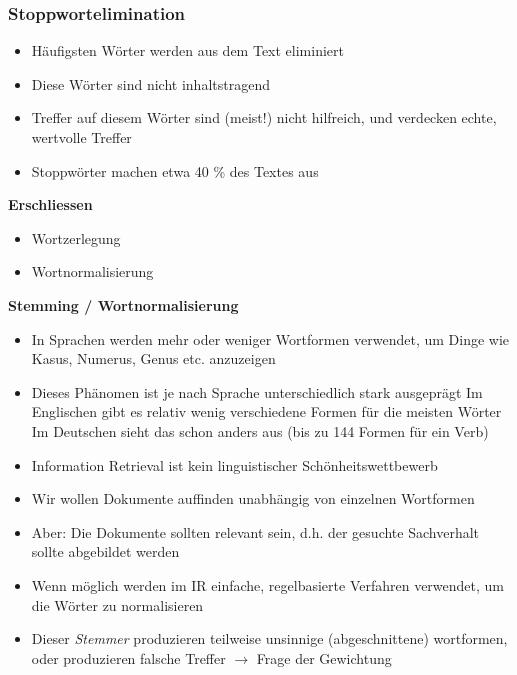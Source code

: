 \documentclass{report}
\theoremstyle{definition}
\theoremstyle{example}
\begin{document}
\subsubsection{Stoppwortelimination}
\begin{itemize}
   \item Häufigsten Wörter werden aus dem Text eliminiert
   \item Diese Wörter sind nicht inhaltstragend
   \item Treffer auf diesem Wörter sind (meist!) nicht hilfreich, und verdecken echte, wertvolle Treffer
   \item Stoppwörter machen etwa 40 \% des Textes aus
\end{itemize}

\textbf{Erschliessen}
\begin{itemize}
   \item Wortzerlegung
   \item Wortnormalisierung
\end{itemize}

\textbf{Stemming / Wortnormalisierung}
\begin{itemize}
   \item In Sprachen werden mehr oder weniger Wortformen verwendet, um Dinge wie Kasus, Numerus, Genus etc. anzuzeigen
   \item Dieses Phänomen ist je nach Sprache unterschiedlich stark ausgeprägt
   \subitem Im Englischen gibt es relativ wenig verschiedene Formen für die meisten Wörter
   \subitem Im Deutschen sieht das schon anders aus (bis zu 144 Formen für ein Verb) 
   \item Information Retrieval ist kein linguistischer Schönheitswettbewerb
   \item Wir wollen Dokumente auffinden unabhängig von einzelnen Wortformen
   \item Aber: Die Dokumente sollten relevant sein, d.h. der gesuchte Sachverhalt sollte abgebildet werden
   \item Wenn möglich werden im IR einfache, regelbasierte Verfahren verwendet, um die Wörter zu normalisieren
   \item Dieser \textit{Stemmer} produzieren teilweise unsinnige (abgeschnittene) wortformen, oder produzieren falsche Treffer $\rightarrow$ Frage der Gewichtung
\end{itemize}
\end{document}
